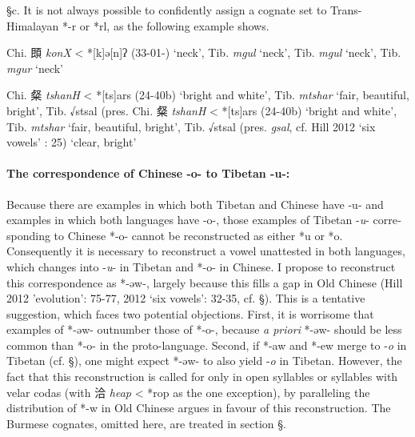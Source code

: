 §c. It is not always possible to confidently assign a cognate set to
Trans-Himalayan *-r or *rl, as the following example shows.

\begin{description} \item
Chi. 䫀 \emph{konX} \textless{} *[k]{}ə[n]ʔ (33-01-) `neck', Tib. {} \emph{mgul} `neck', Tib. 
{} \emph{mgul} `neck', Tib. {} \emph{mgur} `neck'

\item
Chi. 粲 \emph{tshanH} \textless{} *[ts{}]{}ars (24-40b) `bright and
white', Tib. {} \emph{mtshar} `fair, beautiful, bright', Tib. √stsal
(pres. 
Chi. 粲 \emph{tshanH}
\textless{} *[ts{}]{}ars (24-40b) `bright and white', Tib. {} \emph{mtshar} `fair, beautiful, bright', Tib. √stsal (pres. {} \emph{gsal}, cf. Hill 2012 `six vowels' : 25) `clear, bright'
\end{description}

\paragraph{The correspondence of Chinese -o- to Tibetan -u-:} Because
there are examples in which both Tibetan and Chinese have -u- and
examples in which both languages have -o-, those examples of Tibetan
-\emph{u}- cor­re­spond­ing to Chinese *-o- cannot be reconstructed as
either *u or *o. Consequently it is necessary to reconstruct a vowel
unattested in both languages, which changes into -\emph{u}- in Tibetan
and *-o- in Chinese. I propose to reconstruct this correspondence as
*-əw-, largely because this fills a gap in Old Chinese (Hill 2012
'evolution': 75-77, 2012 `six vowels': 32-35, cf. §). This is a
tentative suggestion, which faces two potential objections. First, it is
worrisome that examples of *-əw- outnumber those of *-o-, because
 \emph{a priori} *-əw- should be less common than *-o- in the
proto-language. Second, if *-aw and *-ew merge to -\emph{o} in Tibetan
(cf. §), one might expect *-əw- to also yield -\emph{o} in Tibetan.
However, the fact that this re­con­struc­tion is called for only in open
syllables or syllables with velar codas (with 洽 \emph{heap} \textless{}
*{}rop as the one exception), by pa­ral­le­ling the distribution of *-w
in Old Chinese argues in favour of this reconstruction. The Burmese
cognates, omitted here, are treated in section §.

